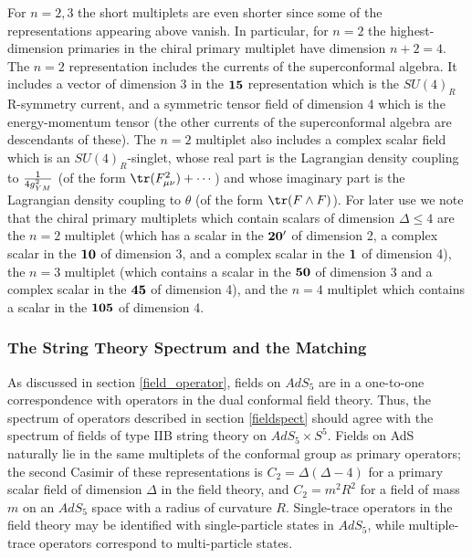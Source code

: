 For $n=2,3$ the short multiplets are even shorter since some of the
representations appearing above vanish. In particular, for $n=2$ the
highest-dimension primaries in the chiral primary multiplet have
dimension $n+2=4$. The $n=2$ representation includes the currents of
the superconformal algebra. It includes a vector of dimension 3 in the
$\bf 15$ representation which is the $SU(4)_R$ R-symmetry current, and
a symmetric tensor field of dimension 4 which is the energy-momentum
tensor (the other currents of the superconformal algebra are
descendants of these). The $n=2$ multiplet also includes a complex
scalar field which is an $SU(4)_R$-singlet, whose real part is the
Lagrangian density coupling to ${1\over {4g_{YM}^2}}$ (of the form
$\tr(F_{\mu \nu}^2) + \cdots$) and whose imaginary part is the
Lagrangian density coupling to $\theta$ (of the form $\tr(F\wedge
F)$). For later use we note that the chiral primary multiplets which
contain scalars of dimension $\Delta \leq 4$ are the $n=2$ multiplet
(which has a scalar in the ${\bf 20'}$ of dimension 2, a complex
scalar in the $\bf 10$ of dimension 3, and a complex scalar in the $\bf
1$ of dimension 4), the $n=3$ multiplet (which contains a scalar in
the $\bf 50$ of dimension 3 and a complex scalar in the $\bf 45$ of
dimension 4), and the $n=4$ multiplet which contains a scalar in the
$\bf 105$ of dimension 4.

\subsubsection{The String Theory Spectrum and the Matching}
\label{stringy_spect}

As discussed in section \ref{field_operator}, 
fields on $AdS_5$ are in a one-to-one
correspondence with operators in the dual conformal field
theory. Thus, the spectrum of operators described in section
\ref{fieldspect} should agree with the spectrum of fields of type IIB
string theory on $AdS_5\times S^5$. Fields on AdS naturally lie in the
same multiplets of the conformal group as primary operators; the
second Casimir of these representations is $C_2=\Delta(\Delta-4)$ for
a primary scalar field of dimension $\Delta$ in the field theory, and
$C_2=m^2 R^2$ for a field of mass $m$ on an $AdS_5$ space with a
radius of curvature $R$. Single-trace operators in the field theory
may be identified with single-particle states in $AdS_5$, while
multiple-trace operators correspond to multi-particle states.

